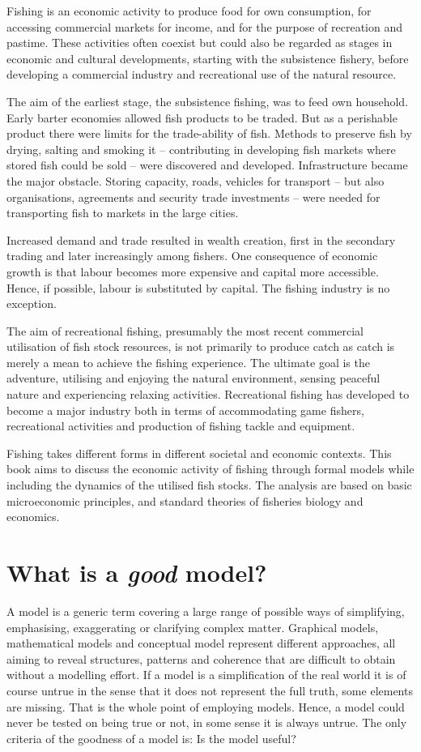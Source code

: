 \documentclass[11pt,fleqn]{book} %
\begin{document}
Fishing is an economic activity to produce food for own consumption, for accessing commercial markets for income, and for the purpose of recreation and pastime. These activities often coexist but could also be regarded as stages in economic and cultural developments, starting with the subsistence fishery, before developing a commercial industry and recreational use of the natural resource.

The aim of the earliest stage, the subsistence fishing, was to feed own household. Early barter economies allowed fish products to be traded. But as a perishable product there were limits for the trade-ability of fish. Methods to preserve fish by drying, salting and smoking it -- contributing in developing fish markets where stored fish could be sold -- were discovered and developed. Infrastructure became the major obstacle. Storing capacity, roads, vehicles for transport -- but also organisations, agreements and security trade investments -- were needed for transporting fish to markets in the large cities.

Increased demand and trade resulted in wealth creation, first in the secondary trading and later increasingly among fishers. One consequence of economic growth is that labour becomes more expensive and capital more accessible. Hence, if possible, labour is substituted by capital. The fishing industry is no exception.

The aim of recreational fishing, presumably the most recent commercial utilisation of fish stock resources, is not primarily to produce catch as catch is merely a mean to achieve the fishing experience. The ultimate goal is the adventure, utilising and enjoying the natural environment, sensing peaceful nature and experiencing relaxing activities. Recreational fishing has developed to become a major industry both in terms of accommodating game fishers, recreational activities and production of fishing tackle and equipment.

Fishing takes different forms in different societal and economic contexts. This book aims to discuss the economic activity of fishing through formal models while including the dynamics of the utilised fish stocks. The analysis are based on basic microeconomic principles, and standard theories of fisheries biology and economics. 

\section{What is a \textit{good} model?}\label{goodmodel}
A model is a generic term covering a large range of possible ways of simplifying, emphasising, exaggerating or clarifying complex matter. Graphical models, mathematical models and conceptual model represent different approaches, all aiming to reveal structures, patterns and coherence that are difficult to obtain without a modelling effort. If a model is a simplification of the real world it is of course untrue in the sense that it does not represent the full truth, some elements are missing. That is the whole point of employing models. Hence, a model could never be tested on being true or not, in some sense it is always untrue. The only criteria of the goodness of a model is: Is the model useful?
\end{document}
